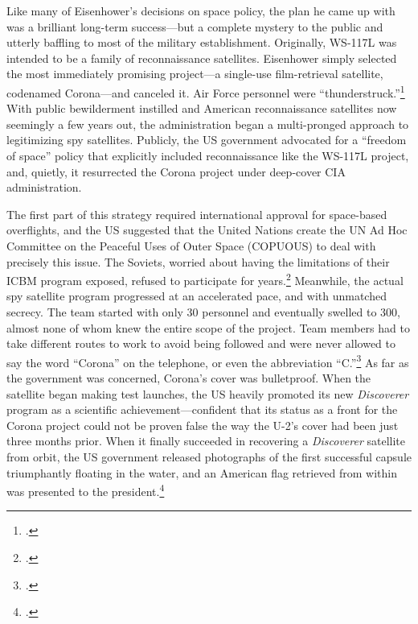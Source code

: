\documentclass[11pt]{memoir}
\begin{document}
Like many of Eisenhower's decisions on space policy, the plan he came up with was a brilliant long-term success---but a complete mystery to the public and utterly baffling to most of the military establishment. Originally, WS-117L was intended to be a family of reconnaissance satellites. Eisenhower simply selected the most immediately promising project---a single-use film-retrieval satellite, codenamed Corona---and canceled it. Air Force personnel were ``thunderstruck.''\footcite[p.~45]{peebles_corona_1997} With public bewilderment instilled and American reconnaissance satellites now seemingly a few years out, the administration began a multi-pronged approach to legitimizing spy satellites. Publicly, the US government advocated for a ``freedom of space'' policy that explicitly included reconnaissance like the WS-117L project, and, quietly, it resurrected the Corona project under deep-cover CIA administration.

The first part of this strategy required international approval for space-based overflights, and the US suggested that the United Nations create the UN Ad Hoc Committee on the Peaceful Uses of Outer Space (COPUOUS) to deal with precisely this issue. The Soviets, worried about having the limitations of their ICBM program exposed, refused to participate for years.\footcite[p.~140]{day_eye_2015} Meanwhile, the actual spy satellite program progressed at an accelerated pace, and with unmatched secrecy. The team started with only 30 personnel and eventually swelled to 300, almost none of whom knew the entire scope of the project. Team members had to take different routes to work to avoid being followed and were never allowed to say the word ``Corona'' on the telephone, or even the abbreviation ``C.''\footcite[p.~51]{peebles_shadow_2000} As far as the government was concerned, Corona's cover was bulletproof. When the satellite began making test launches, the US heavily promoted its new \emph{Discoverer} program as a scientific achievement---confident that its status as a front for the Corona project could not be proven false the way the U-2's cover had been just three months prior. When it finally succeeded in recovering a \emph{Discoverer} satellite from orbit, the US government released photographs of the first successful capsule triumphantly floating in the water, and an American flag retrieved from within was presented to the president.\footcite[p.~83]{peebles_shadow_2000}
\end{document}
